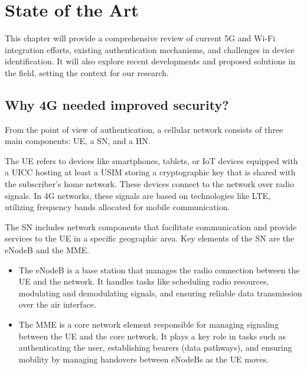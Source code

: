 \chapter{State of the Art}%
\label{chapter:State of the Art}

\begin{introduction}
This chapter will provide a comprehensive review of current \ac{5G} and Wi-Fi integration efforts, existing authentication mechanisms, and challenges in device identification. It will also explore recent developments and proposed solutions in the field, setting the context for our research.
\end{introduction}

\section{Why \ac{4G} needed improved security?}

From the point of view of authentication, a cellular network consists of three main components: \ac{UE}, a \ac{SN}, and a \ac{HN}.

The \ac{UE} refers to devices like smartphones, tablets, or IoT devices equipped with a \ac{UICC}  hosting at least a \ac{USIM} storing a cryptographic key that is shared with the subscriber’s home network. These devices connect to the network over radio signals. In \ac{4G} networks, these signals are based on technologies like \ac{LTE}, utilizing frequency bands allocated for mobile communication.

The \ac{SN} includes network components that facilitate communication and provide services to the \ac{UE} in a specific geographic area. Key elements of the \ac{SN} are the \ac{eNodeB} and the \ac{MME}.

\begin{itemize}
    \item{
        The \ac{eNodeB} is a base station that manages the radio connection between the \ac{UE} and the network. It handles tasks like scheduling radio resources, modulating and demodulating signals, and ensuring reliable data transmission over the air interface.
    }
    \item {
        The \ac{MME} is a core network element responsible for managing signaling between the \ac{UE} and the core network. It plays a key role in tasks such as authenticating the user, establishing bearers (data pathways), and ensuring mobility by managing handovers between eNodeBs as the \ac{UE} moves.
    }
\end{itemize}

